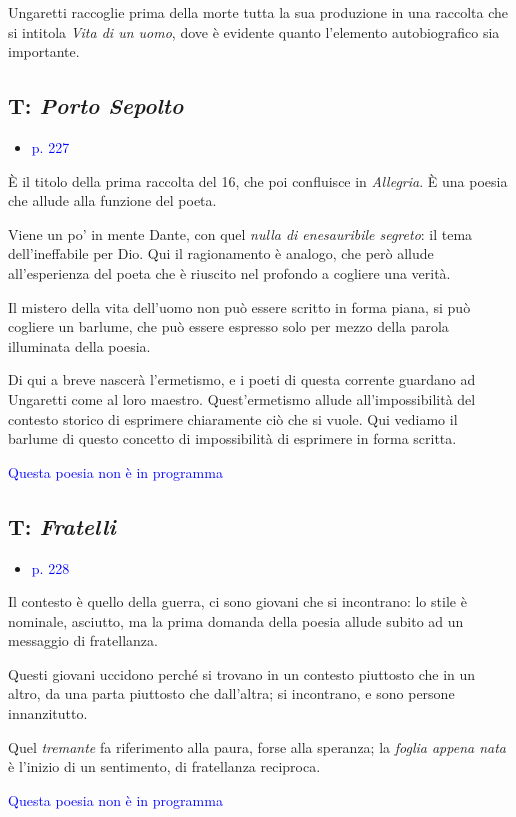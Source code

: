 \documentclass[a4paper, twoside, titlepage]{book}
\newcommand{\elenco}[1]{%
\begin{itemize}
#1
\end{itemize}}
\renewcommand{\emph}[1]{\textcolor{blue}{#1}}
\begin{document}
Ungaretti raccoglie prima della morte tutta la sua produzione in una raccolta che si intitola \textit{Vita di un uomo}, dove è evidente quanto l'elemento autobiografico sia importante.

\subsection{T: \textit{Porto Sepolto}}
\elenco{\item \emph{p. 227}}

È il titolo della prima raccolta del 16, che poi confluisce in \textit{Allegria}. È una poesia che allude alla funzione del poeta.

Viene un po' in mente Dante, con quel \textit{nulla di enesauribile segreto}: il tema dell'ineffabile per Dio. Qui il ragionamento è analogo, che però allude all'esperienza del poeta che è riuscito nel profondo a cogliere una verità.

Il mistero della vita dell'uomo non può essere scritto in forma piana, si può cogliere un barlume, che può essere espresso solo per mezzo della parola illuminata della poesia.

Di qui a breve nascerà l'ermetismo, e i poeti di questa corrente guardano ad Ungaretti come al loro maestro.
Quest'ermetismo allude all'impossibilità del contesto storico di esprimere chiaramente ciò che si vuole. Qui vediamo il barlume di questo concetto di impossibilità di esprimere in forma scritta.

\emph{Questa poesia non è in programma}

\subsection{T: \textit{Fratelli}}
\elenco{\item \emph{p. 228}}

Il contesto è quello della guerra, ci sono giovani che si incontrano: lo stile è nominale, asciutto, ma la prima domanda della poesia allude subito ad un messaggio di fratellanza.

Questi giovani uccidono perché si trovano in un contesto piuttosto che in un altro, da una parta piuttosto che dall'altra; si incontrano, e sono persone innanzitutto.

Quel \textit{tremante} fa riferimento alla paura, forse alla speranza; la \textit{foglia appena nata} è l'inizio di un sentimento, di fratellanza reciproca.

\emph{Questa poesia non è in programma}
\end{document}
